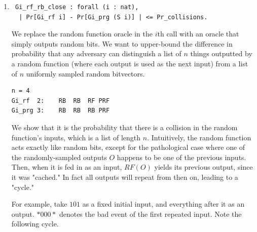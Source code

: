 \documentclass[12pt,lot, lof]{puthesis}
\newcommand{\li} {\lstinline}
\begin{document}
{\begin{enumerate}
\begin{lstlisting}
Definition PRF_Adversary (i : nat) : OracleComp Blist (Bvector eta) bool :=
  bits <--$ oracleCompMap_outer _ _ (Oi_oc' i) maxCallsAndBlocks;
  $ A bits.
\end{lstlisting}  


  
\par
\item \begin{lstlisting}
 Gi_rf_rb_close : forall (i : nat),
  | Pr[Gi_rf i] - Pr[Gi_prg (S i)] | <= Pr_collisions.
  \end{lstlisting} %
 
  We replace the random function oracle in the $i$th call with an oracle that simply outputs random bits. We want to upper-bound the difference in probability that any adversary can distinguish a list of $n$ things outputted by a random function (where each output is used as the next input) from a list of $n$ uniformly sampled random bitvectors. 
    
  \begin{lstlisting}
n = 4
Gi_rf  2:    RB  RB  RF PRF
Gi_prg 3:    RB  RB  RB PRF
\end{lstlisting}
  
  We show that it is the probability that there is a collision in the random function's inputs, which is a list of length $n$. Intuitively, the random function acts exactly like random bits, except for the pathological case where one of the randomly-sampled outputs $O$ happens to be one of the previous inputs. Then, when it is fed in as an input, $RF(O)$ yields its previous output, since it was "cached." In fact all outputs will repeat from then on, leading to a "cycle." 
  
  For example, take $101$ as a fixed initial input, and everything after it as an output. $*000*$ denotes the bad event of the first repeated input. Note the following cycle.
  

\end{enumerate}}
\end{document}
